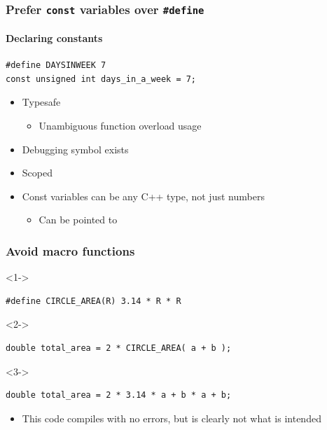 \documentclass[table]{beamer}
\newcounter{rulecount}
\newcommand{\declarerule}{\textbf{\color{themeblue}{Rule \therulecount:}} }
\begin{document}
\begin{frame}[fragile]
    \frametitle{\declarerule Prefer \texttt{const} variables over \texttt{\#define}}
    \framesubtitle{Declaring constants}
\begin{lstlisting}
#define DAYSINWEEK 7
const unsigned int days_in_a_week = 7;
\end{lstlisting}
    \begin{itemize}
        \item Typesafe
            \begin{itemize}
                \item Unambiguous function overload usage
            \end{itemize}
        \item Debugging symbol exists
        \item Scoped
        \item Const variables can be any C++ type, not just numbers
            \begin{itemize}
                \item Can be pointed to
            \end{itemize}
    \end{itemize}
\end{frame}

\begin{frame}[fragile]
    \frametitle{\declarerule Avoid macro functions}
\begin{uncoverenv}<1->
\begin{lstlisting}[title=Given an innocent macro definition]
#define CIRCLE_AREA(R) 3.14 * R * R
\end{lstlisting}
\end{uncoverenv}

\begin{uncoverenv}<2->
\begin{lstlisting}[title=You write]
double total_area = 2 * CIRCLE_AREA( a + b );
\end{lstlisting}
\end{uncoverenv}

\begin{uncoverenv}<3->
\begin{lstlisting}[title=The compiler sees]
double total_area = 2 * 3.14 * a + b * a + b;
\end{lstlisting}
\begin{itemize}
    \item This code compiles with no errors,
        but is clearly not what is intended
\end{itemize}
\end{uncoverenv}

\end{frame}
\end{document}
